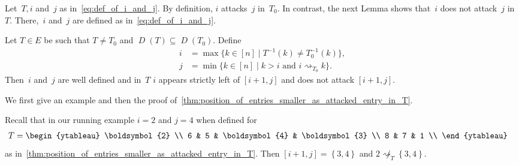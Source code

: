 \documentclass[ALCO,ThmDefs,Unicode,epreuves]{cedram}
\newcommand{\bs}[1]{\boldsymbol{#1} }
\newcommand{\D}{\operatorname{\mathit{D}}}
\newcommand{\set}[1]{\left\{ #1 \right\}}
\newcommand{\att}{\rightsquigarrow}
\begin{document}
Let~$T,i$ and~$j$ as in~\eqref{eq:def_of_i_and_j}.
By definition, $i$ attacks~$j$ in~$T_0$.
In contrast, the next Lemma shows that~$i$ does not attack~$j$ in~$T$.
There,~$i$ and~$j$ are defined as in~\eqref{eq:def_of_i_and_j}.

\begin{lemma}
	\label{thm:position_of_entries_smaller_as_attacked_entry_in_T}
	Let $T\in E$ be such that $T\neq T_0$ and $\D(T) \subseteq \D(T_0)$. Define
	\begin{align*}
		i &= \max \big\{k \in [n] \mid T^{-1}(k) \neq T^{-1}_0(k)\big\}, \\
		j &= \min \big\{k \in [n] \mid k>i \text{ and } i\att_{T_0} k\big\}.
	\end{align*}
	Then~$i$ and~$j$ are well defined and in~$T$ $i$ appears strictly left of $[i+1,j]$ and does not attack $[i+1,j]$. 
\end{lemma}

We first give an example and then the proof of~\cref{thm:position_of_entries_smaller_as_attacked_entry_in_T}\!.

\begin{samepage}
\begin{exam} Recall that in our running example $i=2$ and $j=4$ when defined for
	\begin{align*}
		T &= 
		\begin{ytableau} 
			\bs 2 \\ 
			6 & 5 & \bs4 & \bs3 \\ 
			8 & 7 & 1 \\ 
		\end{ytableau}
	\end{align*} 
	 as in~\cref{thm:position_of_entries_smaller_as_attacked_entry_in_T}. Then
 $[i+1,j] = \set{3,4}$ and $2\not \att_T \set{3,4}$.
\end{exam}
\end{samepage}
\end{document}
